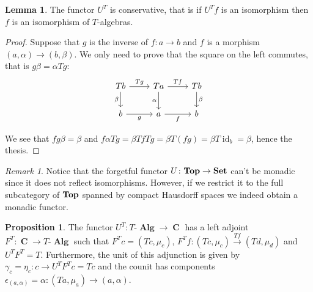 \documentclass[a4paper,11pt,twoside, openany]{book}
\newcommand{\catname}[1]{{\normalfont\textbf{#1}}}
\DeclareMathOperator{\Alg}{\mathbf{Alg}}
\newcommand{\Set}{\catname{Set}}
\newcommand{\Top}{\catname{Top}}
\DeclareMathOperator{\C}{\mathbf{C}}
\DeclareMathOperator{\id}{id}
\theoremstyle{definition}
\theoremstyle{definition}
\newtheorem{prop}[thm]{Proposition}
\newtheorem{lemma}[thm]{Lemma}
\theoremstyle{remark}
\newtheorem{rmk}[thm]{Remark}
\begin{document}
	\begin{lemma}
		The functor $U^T$ is conservative, that is if $U^Tf$ is an isomorphism then $f$ is an isomorphism of $T$-algebras.
	\end{lemma}
	\begin{proof}
		Suppose that $g$ is the inverse of $f\colon a\rightarrow b$ and $f$ is a morphism $(a,\alpha)\rightarrow (b,\beta)$. We only need to prove that the square on the left commutes, that is $g\beta=\alpha Tg$:
		\[
		\begin{tikzcd}
		Tb\arrow["\beta"']{d}\arrow["Tg"]{r}
		& Ta\arrow["\alpha"']{d}\arrow["Tf"]{r}
		& Tb\arrow["\beta"]{d} \\
		b\arrow["g"']{r}
		& a\arrow["f"']{r}
		& b
		\end{tikzcd}
		\]
		
		We see that $fg\beta=\beta$ and $f\alpha Tg=\beta Tf Tg=\beta T(fg)=\beta T\id_b=\beta$, hence the thesis.
	\end{proof}
	\begin{rmk}
		Notice that the forgetful functor $U\colon\Top\to\Set$ can't be monadic since it does not reflect isomorphisms. However, if we restrict it to the full subcategory of $\Top$ spanned by compact Hausdorff spaces we indeed obtain a monadic functor.
	\end{rmk}
	\begin{prop}
		The functor $U^T\colon T\mbox{-}\Alg\rightarrow\C$ has a left adjoint $F^T\colon\C\rightarrow T\mbox{-}\Alg$ such that $F^Tc=(Tc,\mu_{c})$, $F^Tf\colon(Tc,\mu_{c})\xrightarrow{Tf} (Td,\mu_{d})$ and $U^TF^T=T$. Furthermore, the unit of this adjunction is given by $\gamma_c=\eta_c\colon c\to U^TF^Tc=Tc$ and the counit has components $\epsilon_{(a,\alpha)}=\alpha\colon(Ta,\mu_a)\to(a,\alpha)$.
	\end{prop}
\end{document}

